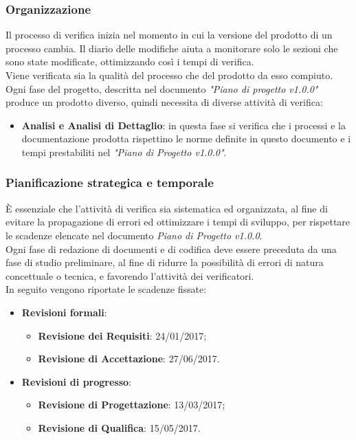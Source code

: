 \documentclass[12pt,a4paper,titlepage]{article}
\begin{document}
	\subsubsection{Organizzazione}
	Il processo di verifica inizia nel momento in cui la versione del prodotto di un processo cambia. Il diario delle modifiche aiuta a monitorare solo le sezioni che sono state modificate, ottimizzando così i tempi di verifica.\\
	Viene verificata sia la qualità del processo che del prodotto da esso compiuto.\\
	Ogni fase del progetto, descritta nel documento \textit{"Piano di progetto v1.0.0"} produce un prodotto diverso, quindi necessita di diverse attività di verifica:
	\begin{itemize}
		\item \textbf{Analisi e Analisi di Dettaglio}: in questa fase si verifica che i processi e la documentazione prodotta rispettino le norme definite in questo documento e i tempi prestabiliti nel \textit{"Piano di Progetto v1.0.0"}.
	\end{itemize}
\subsubsection{Pianificazione strategica e temporale}
	È essenziale che l'attività di verifica sia sistematica ed organizzata, al fine di evitare la propagazione di errori ed ottimizzare i tempi di sviluppo, per rispettare le scadenze elencate nel documento \textit{Piano di Progetto v1.0.0}.\\
	Ogni fase di redazione di documenti e di codifica deve essere preceduta da una fase di studio preliminare, al fine di ridurre la possibilità di errori di natura concettuale o tecnica, e favorendo l'attività dei verificatori.\\
	In seguito vengono riportate le scadenze fissate:
	\begin{itemize}
		\item \textbf{Revisioni formali}:
			\begin{itemize}
				\item \textbf{Revisione dei Requisiti}: 24/01/2017;
				\item \textbf{Revisione di Accettazione}: 27/06/2017.
			\end{itemize}
		\item \textbf{Revisioni di progresso}:
			\begin{itemize}
				\item \textbf{Revisione di Progettazione}: 13/03/2017;
				\item \textbf{Revisione di Qualifica}: 15/05/2017.
			\end{itemize}
	\end{itemize}
\end{document}
